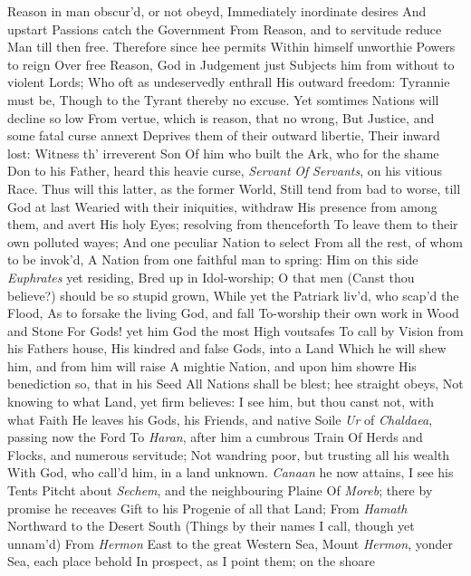 \documentclass[11pt]{book}
\newcounter {last}
\begin{document}
Reason in man obscur'd, or not obeyd, 
Immediately inordinate desires 
And upstart Passions catch the Government 
From Reason, and to servitude reduce 
Man till then free.  Therefore since hee permits 
Within himself unworthie Powers to reign 
Over free Reason, God in Judgement just 
Subjects him from without to violent Lords; 
Who oft as undeservedly enthrall 
His outward freedom: Tyrannie must be, 
Though to the Tyrant thereby no excuse. 
Yet somtimes Nations will decline so low 
From vertue, which is reason, that no wrong, 
But Justice, and some fatal curse annext 
Deprives them of their outward libertie, 
Their inward lost: Witness th' irreverent Son 
Of him who built the Ark, who for the shame 
Don to his Father, heard this heavie curse, 
\textit{Servant} \textit{Of} \textit{Servants}, on his vitious Race. 
Thus will this latter, as the former World, 
Still tend from bad to worse, till God at last 
Wearied with their iniquities, withdraw 
His presence from among them, and avert 
His holy Eyes; resolving from thenceforth 
To leave them to their own polluted wayes; 
And one peculiar Nation to select 
From all the rest, of whom to be invok'd, 
A Nation from one faithful man to spring: 
Him on this side \textit{Euphrates} yet residing, 
Bred up in Idol-worship; O that men 
(Canst thou believe?) should be so stupid grown, 
While yet the Patriark liv'd, who scap'd the Flood, 
As to forsake the living God, and fall 
To-worship their own work in Wood and Stone 
For Gods! yet him God the most High voutsafes 
To call by Vision from his Fathers house, 
His kindred and false Gods, into a Land 
Which he will shew him, and from him will raise 
A mightie Nation, and upon him showre 
His benediction so, that in his Seed 
All Nations shall be blest; hee straight obeys, 
Not knowing to what Land, yet firm believes: 
I see him, but thou canst not, with what Faith 
He leaves his Gods, his Friends, and native Soile 
\textit{Ur} of \textit{Chaldaea}, passing now the Ford 
To \textit{Haran}, after him a cumbrous Train 
Of Herds and Flocks, and numerous servitude; 
Not wandring poor, but trusting all his wealth 
With God, who call'd him, in a land unknown. 
\textit{Canaan} he now attains, I see his Tents 
Pitcht about \textit{Sechem}, and the neighbouring Plaine 
Of \textit{Moreb}; there by promise he receaves 
Gift to his Progenie of all that Land; 
From \textit{Hamath} Northward to the Desert South 
(Things by their names I call, though yet unnam'd) 
From \textit{Hermon} East to the great Western Sea, 
Mount \textit{Hermon}, yonder Sea, each place behold 
In prospect, as I point them; on the shoare 
\end{document}
